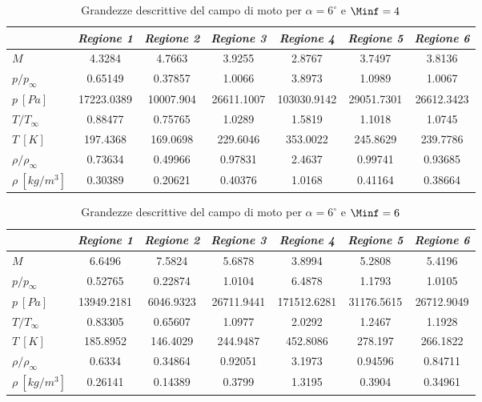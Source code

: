 \begin{table} [!h]
	\centering {}
	\begin{tabular}{l  c  c c c c c}   
		 \toprule&    
		 \emph{Regione 1}& \emph{Regione 2}& \emph{Regione 3}& \emph{Regione 4}& \emph{Regione 5}& \emph{Regione 6}   \\  \midrule
		 $M$ &4.3284 &4.7663 &3.9255 &2.8767 &3.7497 &3.8136 \\
		 $p/p_{\infty}$ &0.65149 &0.37857 &1.0066 &3.8973 &1.0989 &1.0067 \\
		 $p \ [\si{Pa}]$ &17223.0389 &10007.904 &26611.1007 &103030.9142 &29051.7301 &26612.3423 \\
		 $T/T_{\infty}$ &0.88477&0.75765&1.0289&1.5819&1.1018&1.0745\\
		 $T \ [K]$ &197.4368&169.0698&229.6046&353.0022&245.8629&239.7786\\
		 $\rho/\rho_{\infty}$ &0.73634&0.49966&0.97831&2.4637&0.99741&0.93685\\
		 $\rho \ [kg/m^3]$ &0.30389&0.20621&0.40376&1.0168&0.41164&0.38664\\
		 \bottomrule
		 \end{tabular}
		 \caption {\footnotesize Grandezze descrittive del campo di moto per $\alpha=6^\circ$ e $\Minf=4$}\label{tabS7}\end{table}				
	
\begin{table} [!h]
	\centering 
	\begin{tabular}{l  c  c c c c c}    
		\toprule&
		    \emph{Regione 1}& \emph{Regione 2}& \emph{Regione 3}& \emph{Regione 4}& \emph{Regione 5}& \emph{Regione 6}   \\  \midrule$M$ &6.6496 &7.5824 &5.6878 &3.8994 &5.2808 &5.4196 \\
		    $p/p_{\infty}$ &0.52765 &0.22874 &1.0104 &6.4878 &1.1793 &1.0105 \\
		    $p \ [\si{Pa}]$ &13949.2181 &6046.9323 &26711.9441 &171512.6281 &31176.5615 &26712.9049 \\
		    $T/T_{\infty}$ &0.83305&0.65607&1.0977&2.0292&1.2467&1.1928\\
		    $T \ [K]$ &185.8952&146.4029&244.9487&452.8086&278.197&266.1822\\
		    $\rho/\rho_{\infty}$ &0.6334&0.34864&0.92051&3.1973&0.94596&0.84711\\
		    $\rho \ [kg/m^3]$ &0.26141&0.14389&0.3799&1.3195&0.3904&0.34961\\
		    \bottomrule
		    \end{tabular}
		    \caption {\footnotesize Grandezze descrittive del campo di moto per $\alpha=6^\circ$ e $\Minf=6$}\label{tabS8}
\end{table}	


